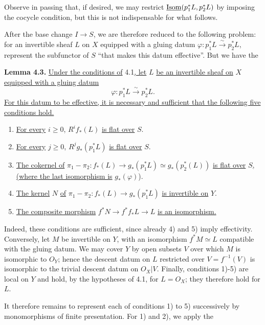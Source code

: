 Observe in passing that, if desired, we may restrict \(\underline{\operatorname{Isom}}(p_1^*L,p_2^*L)\) by imposing the cocycle condition, but this is not indispensable for what follows.

After the base change \(I\to S\), we are therefore reduced to the following problem: for an invertible sheaf \(L\) on \(X\) equipped with a gluing datum \(\varphi:p_1^*L\xrightarrow{\sim}p_2^*L\), represent the subfunctor of \(S\) ``that makes this datum effective''. But we have the

\textbf{Lemma 4.3.} \uline{Under the conditions of} 4.1\uline{, let} \(L\) \uline{be an invertible sheaf on} \(X\) \uline{equipped with a gluing datum}
\[
  \varphi:p_1^*L\xrightarrow{\sim}p_2^*L.
\]
\uline{For this datum to be effective, it is necessary and sufficient that the following five conditions hold.}
\begin{enumerate}[label=\arabic*)]
\item \uline{For every} \(i\ge0\), \(R^if_*(L)\) \uline{is flat over} \(S\).
\item \uline{For every} \(j\ge0\), \(R^jg_*(p_1^*L)\) \uline{is flat over} \(S\).
\item \uline{The cokernel of} \(\pi_1-\pi_2:f_*(L)\longrightarrow g_*(p_1^*L)\simeq g_*(p_2^*(L))\) \uline{is flat over} \(S\)\uline{, (where the last isomorphism is} \(g_*(\varphi)\)).
\item \uline{The kernel} \(N\) \uline{of} \(\pi_1-\pi_2:f_*(L)\to g_*(p_1^*L)\) \uline{is invertible on} \(Y\).
\item \uline{The composite morphism} \(f^*N\to f^*f_*L\to L\) \uline{is an isomorphism.}
\end{enumerate}


%
Indeed, these conditions are sufficient, since already 4) and 5) imply effectivity. Conversely, let \(M\) be invertible on \(Y\), with an isomorphism \(f^*M\simeq L\) compatible with the gluing datum. We may cover \(Y\) by open subsets \(V\) over which \(M\) is isomorphic to \({O}_Y\); hence the descent datum on \(L\) restricted over \(V=f^{-1}(V)\) is isomorphic to the trivial descent datum on \({O}_X|V\). Finally, conditions 1)-5) are local on \(Y\) and hold, by the hypotheses of 4.1, for \(L={O}_X\); they therefore hold for \(L\).

It therefore remains to represent each of conditions 1) to 5) successively by monomorphisms of finite presentation. For 1) and 2), we apply the

